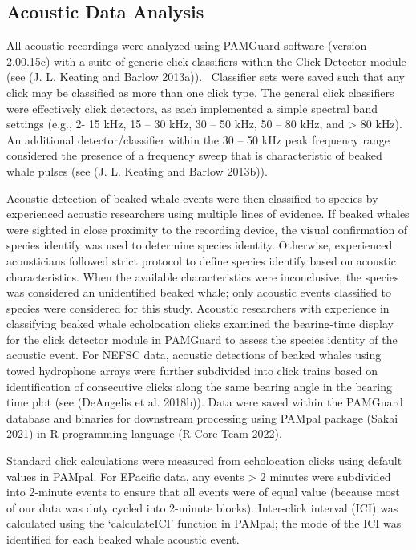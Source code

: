 \documentclass[
  letterpaper,
  DIV=11,
  numbers=noendperiod]{scrartcl}
\begin{document}
\hypertarget{acoustic-data-analysis}{%
\subsection{Acoustic Data Analysis}\label{acoustic-data-analysis}}

All acoustic recordings were analyzed using PAMGuard software (version
2.00.15c) with a suite of generic click classifiers within the Click
Detector module (see (J. L. Keating and Barlow 2013a)).~ Classifier sets
were saved such that any click may be classified as more than one click
type. The general click classifiers were effectively click detectors, as
each implemented a simple spectral band settings (e.g., 2- 15 kHz, 15 --
30 kHz, 30 -- 50 kHz, 50 -- 80 kHz, and \textgreater{} 80 kHz). An
additional detector/classifier within the 30 -- 50 kHz peak frequency
range considered the presence of a frequency sweep that is
characteristic of beaked whale pulses (see (J. L. Keating and Barlow
2013b)).

Acoustic detection of beaked whale events were then classified to
species by experienced acoustic researchers using multiple lines of
evidence. If beaked whales were sighted in close proximity to the
recording device, the visual confirmation of species identify was used
to determine species identity. Otherwise, experienced acousticians
followed strict protocol to define species identify based on acoustic
characteristics. When the available characteristics were inconclusive,
the species was considered an unidentified beaked whale; only acoustic
events classified to species were considered for this study. Acoustic
researchers with experience in classifying beaked whale echolocation
clicks examined the bearing-time display for the click detector module
in PAMGuard to assess the species identity of the acoustic event. For
NEFSC data, acoustic detections of beaked whales using towed hydrophone
arrays were further subdivided into click trains based on identification
of consecutive clicks along the same bearing angle in the bearing time
plot (see (DeAngelis et al. 2018b)). Data were saved within the PAMGuard
database and binaries for downstream processing using PAMpal package
(Sakai 2021) in R programming language (R Core Team 2022).

Standard click calculations were measured from echolocation clicks using
default values in PAMpal. For EPacific data, any events \textgreater{} 2
minutes were subdivided into 2-minute events to ensure that all events
were of equal value (because most of our data was duty cycled into
2-minute blocks). Inter-click interval (ICI) was calculated using the
`calculateICI' function in PAMpal; the mode of the ICI was identified
for each beaked whale acoustic event.
\end{document}
